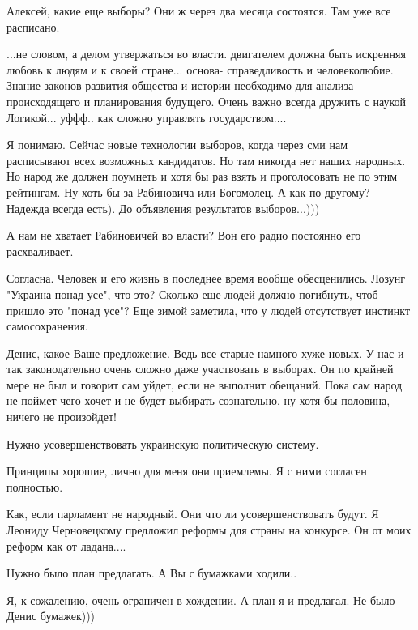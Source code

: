 \begin{itemize}
Алексей, какие еще выборы? Они ж через два месяца состоятся. Там уже все расписано.


...не словом, а делом утвержаться во власти. двигателем должна быть искренняя
любовь к людям и к своей стране... основа- справедливость и человеколюбие.
Знание законов развития общества и истории необходимо для анализа происходящего
и планирования будущего. Очень важно всегда дружить с наукой Логикой... уффф..
как сложно управлять государством....

Я понимаю. Сейчас новые технологии выборов, когда через сми нам расписывают
всех возможных кандидатов. Но там никогда нет наших народных. Но народ же
должен поумнеть и хотя бы раз взять и проголосовать не по этим рейтингам. Ну
хоть бы за Рабиновича или Богомолец. А как по другому? Надежда всегда есть). До
объявления результатов выборов...)))


А нам не хватает Рабиновичей во власти? Вон его радио постоянно его расхваливает.


Согласна. Человек и его жизнь в последнее время вообще обесценились. Лозунг
"Украина понад усе", что это? Сколько еще людей должно погибнуть, чтоб пришло
это "понад усе"? Еще зимой заметила, что у людей отсутствует инстинкт
самосохранения.



Денис, какое Ваше предложение. Ведь все старые намного хуже новых. У нас и так
законодательно очень сложно даже участвовать в выборах. Он по крайней мере не
был и говорит сам уйдет, если не выполнит обещаний. Пока сам народ не поймет
чего хочет и не будет выбирать сознательно, ну хотя бы половина, ничего не
произойдет!

Нужно усовершенствовать украинскую политическую систему.

Принципы хорошие, лично для меня они приемлемы. Я с ними согласен полностью.


Как, если парламент не народный. Они что ли усовершенствовать будут. Я Леониду
Черновецкому предложил реформы для страны на конкурсе. Он от моих реформ как от
ладана....

Нужно было план предлагать. А Вы с бумажками ходили..

Я, к сожалению, очень ограничен в хождении. А план я и предлагал. Не было Денис бумажек)))


\end{itemize}

